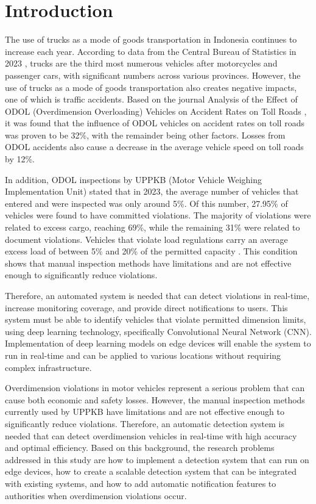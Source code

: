 \section{Introduction}
\label{sec:introduction}


The use of trucks as a mode of goods transportation in Indonesia continues to increase each year. According to data from the Central Bureau of Statistics in 2023 \cite{bps2023}, trucks are the third most numerous vehicles after motorcycles and passenger cars, with significant numbers across various provinces. However, the use of trucks as a mode of goods transportation also creates negative impacts, one of which is traffic accidents. Based on the journal Analysis of the Effect of ODOL (Overdimension Overloading) Vehicles on Accident Rates on Toll Roads \cite{odol2020}, it was found that the influence of ODOL vehicles on accident rates on toll roads was proven to be 32\%, with the remainder being other factors. Losses from ODOL accidents also cause a decrease in the average vehicle speed on toll roads by 12\%.

In addition, ODOL inspections by UPPKB (Motor Vehicle Weighing Implementation Unit) stated that in 2023, the average number of vehicles that entered and were inspected was only around 5\%. Of this number, 27.95\% of vehicles were found to have committed violations. The majority of violations were related to excess cargo, reaching 69\%, while the remaining 31\% were related to document violations. Vehicles that violate load regulations carry an average excess load of between 5\% and 20\% of the permitted capacity \cite{hubdat2024}. This condition shows that manual inspection methods have limitations and are not effective enough to significantly reduce violations.

Therefore, an automated system is needed that can detect violations in real-time, increase monitoring coverage, and provide direct notifications to users. This system must be able to identify vehicles that violate permitted dimension limits, using deep learning technology, specifically Convolutional Neural Network (CNN). Implementation of deep learning models on edge devices will enable the system to run in real-time and can be applied to various locations without requiring complex infrastructure.

Overdimension violations in motor vehicles represent a serious problem that can cause both economic and safety losses. However, the manual inspection methods currently used by UPPKB have limitations and are not effective enough to significantly reduce violations. Therefore, an automatic detection system is needed that can detect overdimension vehicles in real-time with high accuracy and optimal efficiency. Based on this background, the research problems addressed in this study are how to implement a detection system that can run on edge devices, how to create a scalable detection system that can be integrated with existing systems, and how to add automatic notification features to authorities when overdimension violations occur.


